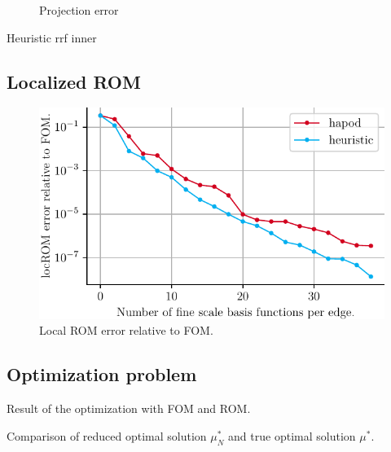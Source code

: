 \documentclass[a4paper]{eccomas_paper-2024}
\begin{document}
\begin{figure}[!htb]
\begin{center}
  \caption{Projection error }\label{fig:proj_error_inner_heuristic}
\endminipage
\end{center}
\end{figure}

\begin{table}
    \centering
    \caption{Heuristic rrf inner}\label{tab:heuristic_inner}
    
\end{table}

\subsection{Localized ROM}

\begin{figure}[!htb]
    \centering
    \includegraphics{./figures/beam/fig_loc_rom_error.pdf}
    \caption{Local ROM error relative to FOM.}\label{fig:loc_rom_error}
\end{figure}

\subsection{Optimization problem}

\begin{table}
    \caption{Result of the optimization with FOM and ROM.}\label{tab:minimization_data}
    \centering
    
\end{table}

\begin{table}
    \caption{Comparison of reduced optimal solution $\mu_N^{\ast}$ and true optimal solution $\mu^{\ast}$.}\label{tab:minimization_comparison}
    \centering
    
\end{table}
\end{document}
